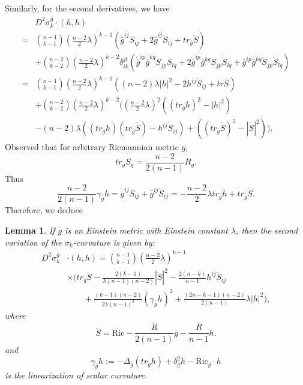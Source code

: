 \documentclass[12pt]{amsart}
\newtheorem{lemma}{Lemma}[section]
\newcommand{\bg}{\bar{g}}
\numberwithin{equation}{section}
\begin{document}
Similarly, for the second derivatives, we have
\begin{align*}
        & D^2\sigma_k^{\bg}\cdot(h,h)\\
        =&\binom{n-1}{k-1} \left(\frac{n-2}{2}\lambda\right)^{k-1} \left(\ddot{\bg}^{ij}S_{ij} + 2\dot{\bg}^{ij}\dot{S}_{ij} + tr_{\bg} \ddot{S} \right)\\
        & + \binom{n-2}{k-2} \left(\frac{n-2}{2}\lambda \right)^{k-2} \delta_{ik}^{jl} \left( \dot{\bg}^{ip} \dot{\bg}^{kq} S_{jp}S_{lq} + 2\dot{\bg}^{ip} \bg^{kq}S_{jp} \dot{S}_{lq} + \bg^{ip} \bg^{kq} \dot{S}_{jp} \dot{S}_{lq} \right)\\
        =&\binom{n-1}{k-1}\left( \frac{n-2}{2} \lambda \right)^{k-1} \left( (n-2)\lambda|h|^2-2h^{ij}\dot{S}_{ij}+tr\ddot{S} \right) \\
        &+\binom{n-2}{k-2} \left( \frac{n-2}{2}\lambda \right)^{k-2} \biggl( \left(\frac{n-2}{2} \lambda \right)^2 \left( \left( tr_{\bg}h \right)^2 - |h|^2\right) \\
        & -(n-2)\lambda\left((tr_{\bg}h) (tr_{\bg}\dot{S}) - h^{ij} \dot{S}_{ij}\right)+\left( (tr_{\bg}\dot{S})^2 - |\dot{S}|^2 \right) \biggr).
    \end{align*}
Observed that for arbitrary Riemannian metric $g$,
\begin{equation*}
    tr_{g}S_g  =  \frac{n-2}{2(n-1)} R_g.
\end{equation*}
Thus
\begin{equation*}
    \frac{n-2}{2(n-1)}\gamma_{\bg}h=\dot{g}^{ij}S_{ij}+\bg^{ij}\dot{S}_{ij}=-\frac{n-2}{2}\lambda tr_{\bg} h+tr_{\bg} \dot{S}.
\end{equation*}
Therefore, we deduce
\begin{lemma}\label{Lemma: 2nd_variation_of_sigma}
    If $\bg$ is an Einstein metric with Einstein constant $\lambda$, then the second variation of the $\sigma_k$-curvature is given by:
    \begin{equation}
    \begin{split}
        D^2 \sigma_k^{\bg} &  \cdot (h,h)
        = \binom{n-1}{k-1} \left(\frac{n-2}{2}\lambda\right)^{k-1} \\
        &\times \bigg( tr_{\bg} \ddot{S} - \frac{2(k-1)}{\lambda(n-1)(n-2)}|\dot{S}|^2-\frac{2(n-k)}{n-1}h^{ij}\dot{S}_{ij}\\
        &\qquad+\frac{(k-1)(n-2)}{2\lambda(n-1)^3}(\gamma_{\bg}h)^2+\frac{(2n-k-1)(n-2)}{2(n-1)}\lambda|h|^2\bigg),
    \end{split}
    \end{equation}
    where
    \begin{equation*}
        \ddot{S}=\ddot{\mathrm{Ric}}-\frac{\ddot{R}}{2(n-1)}\bg-\frac{\dot{R}}{n-1}h.
    \end{equation*}
    and
    \begin{equation*}
        \gamma_{\bg} h := -\Delta_{\bg} \left( tr_{\bg} h\right) + \delta_{\bg}^2 h - \mathrm{Ric}_{\bg} \cdot h
    \end{equation*}
    is the linearization of scalar curvature.
\end{lemma}
\end{document}
